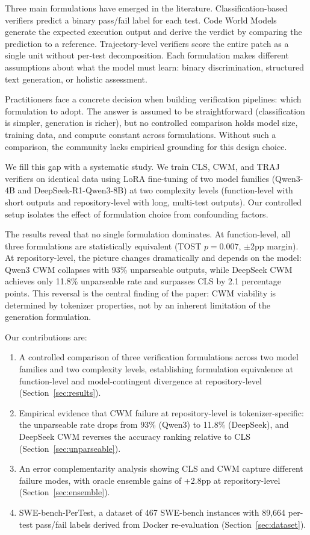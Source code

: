\documentclass[11pt,a4paper]{article}
\begin{document}
Three main formulations have emerged in the literature.
Classification-based verifiers \citep{chen2023codet,ni2023lever} predict a binary pass/fail label for each test.
Code World Models \citep{gu2024cwm} generate the expected execution output and derive the verdict by comparing the prediction to a reference.
Trajectory-level verifiers \citep{zhang2024swebench} score the entire patch as a single unit without per-test decomposition.
Each formulation makes different assumptions about what the model must learn: binary discrimination, structured text generation, or holistic assessment.

Practitioners face a concrete decision when building verification pipelines: which formulation to adopt.
The answer is assumed to be straightforward (classification is simpler, generation is richer), but no controlled comparison holds model size, training data, and compute constant across formulations.
Without such a comparison, the community lacks empirical grounding for this design choice.

We fill this gap with a systematic study.
We train CLS, CWM, and TRAJ verifiers on identical data using LoRA fine-tuning of two model families (Qwen3-4B and DeepSeek-R1-Qwen3-8B) at two complexity levels (function-level with short outputs and repository-level with long, multi-test outputs).
Our controlled setup isolates the effect of formulation choice from confounding factors.

The results reveal that no single formulation dominates.
At function-level, all three formulations are statistically equivalent (TOST $p{=}0.007$, $\pm$2pp margin).
At repository-level, the picture changes dramatically and depends on the model: Qwen3 CWM collapses with 93\% unparseable outputs, while DeepSeek CWM achieves only 11.8\% unparseable rate and surpasses CLS by 2.1 percentage points.
This reversal is the central finding of the paper: CWM viability is determined by tokenizer properties, not by an inherent limitation of the generation formulation.

Our contributions are:
\begin{enumerate}
    \item A controlled comparison of three verification formulations across two model families and two complexity levels, establishing formulation equivalence at function-level and model-contingent divergence at repository-level (Section~\ref{sec:results}).
    \item Empirical evidence that CWM failure at repository-level is tokenizer-specific: the unparseable rate drops from 93\% (Qwen3) to 11.8\% (DeepSeek), and DeepSeek CWM reverses the accuracy ranking relative to CLS (Section~\ref{sec:unparseable}).
    \item An error complementarity analysis showing CLS and CWM capture different failure modes, with oracle ensemble gains of +2.8pp at repository-level (Section~\ref{sec:ensemble}).
    \item SWE-bench-PerTest, a dataset of 467 SWE-bench instances with 89,664 per-test pass/fail labels derived from Docker re-evaluation (Section~\ref{sec:dataset}).
\end{enumerate}
\end{document}
